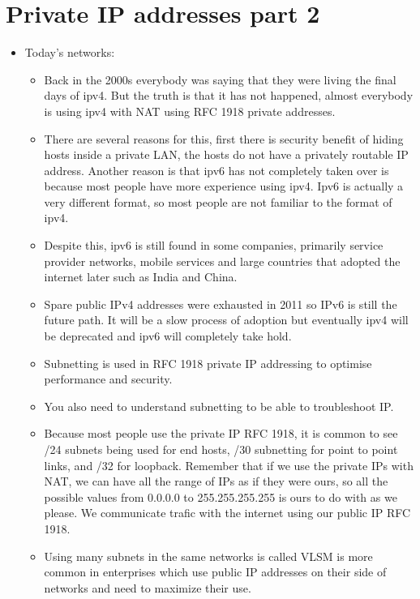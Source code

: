 \section{Private IP addresses part 2}
\begin{itemize}
    \item Today's networks:
        \begin{itemize}
            \item Back in the 2000s everybody was saying that they were living the final days of ipv4. But the truth is that it has not happened, almost everybody is using ipv4 with NAT using RFC 1918 private addresses. 
            \item There are several reasons for this, first there is security benefit of hiding hosts inside a private LAN, the hosts do not have a privately routable IP address. Another reason is that ipv6 has not completely taken over is because most people have more experience using ipv4. Ipv6 is actually a very different format, so most people are not familiar to the format of ipv4.
            \item Despite this, ipv6 is still found in some companies, primarily service provider networks, mobile services and large countries that adopted the internet later such as India and China.
            \item Spare public IPv4 addresses were exhausted in 2011 so IPv6 is still the future path. It will be a slow process of adoption but eventually ipv4 will be deprecated and ipv6 will completely take hold.
            \item Subnetting is used in RFC 1918 private IP addressing to optimise performance and security.
            \item You also need to understand subnetting to be able to troubleshoot IP.
            \item Because most people use the private IP RFC 1918, it is common to see /24 subnets being used for end hosts, /30 subnetting for point to point links, and /32 for loopback. Remember that if we use the private IPs with NAT, we can have all the range of IPs as if they were ours, so all the possible values from 0.0.0.0 to 255.255.255.255 is ours to do with as we please. We communicate trafic with the internet using our public IP RFC 1918.
            \item Using many subnets in the same networks is called VLSM is more common in enterprises which use public IP addresses on their side of networks and need to maximize their use.
        \end{itemize}
    

\end{itemize}
